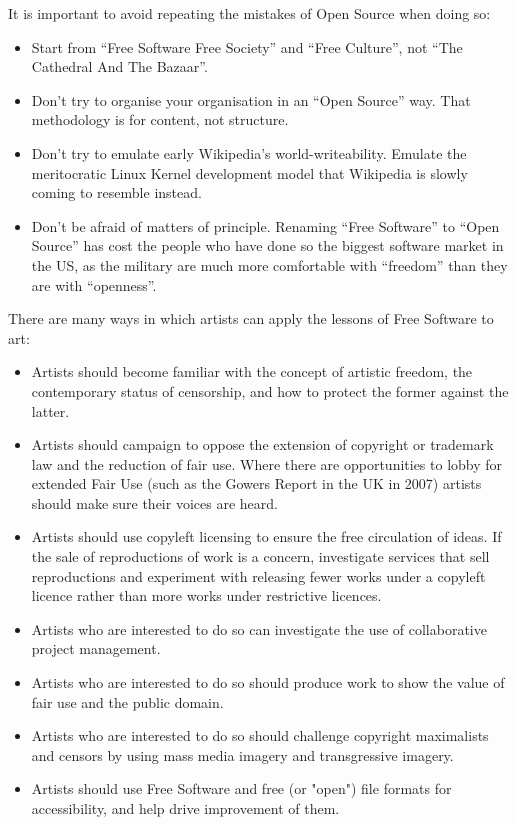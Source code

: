 \documentclass[11pt, a4]{article}
\begin{document}
It is important to avoid repeating the mistakes of Open Source when doing so:

\begin{itemize}
\item Start from ``Free Software Free Society'' and ``Free Culture'', not ``The Cathedral And The Bazaar''. 

\item Don't try to organise your organisation in an ``Open Source'' way. That methodology is for content, not structure.

\item Don't try to emulate early Wikipedia's world-writeability. Emulate the meritocratic Linux Kernel development model that Wikipedia is slowly coming to resemble instead.

\item Don't be afraid of matters of principle. Renaming ``Free Software'' to ``Open Source'' has cost the people who have done so the biggest software market in the US, as the military are much more comfortable with ``freedom'' than they are with ``openness''.
\end{itemize}

There are many ways in which artists can apply the lessons of Free Software to art:

\begin{itemize}

\item Artists should become familiar with the concept of artistic freedom, the contemporary status of censorship, and how to protect the former against the latter.

\item Artists should campaign to oppose the extension of copyright or trademark law and the reduction of fair use. Where there are opportunities to lobby for extended Fair Use (such as the Gowers Report in the UK in 2007) artists should make sure their voices are heard.

\item Artists should use copyleft licensing to ensure the free circulation of ideas. If the sale of reproductions of work is a concern, investigate services that sell reproductions and experiment with releasing fewer works under a copyleft licence rather than more works under restrictive licences.

\item Artists who are interested to do so can investigate the use of collaborative project management.

\item Artists who are interested to do so should produce work to show the value of fair use and the public domain.

\item Artists who are interested to do so should challenge copyright maximalists and censors by using mass media imagery and transgressive imagery.

\item Artists should use Free Software and free (or "open") file formats for accessibility, and help drive improvement of them.

\end{itemize}
\end{document}
